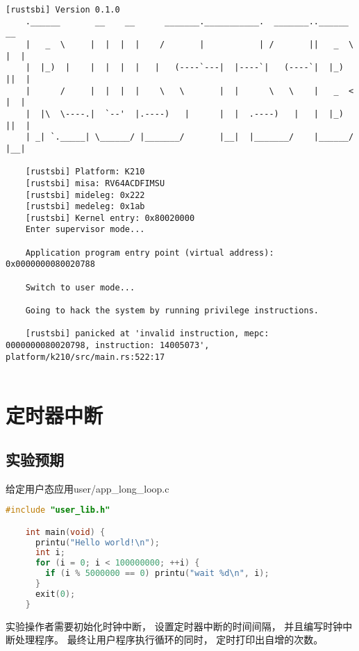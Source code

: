 \begin{lstlisting}[caption={lab2实验结果}, label={lst:app_illegal_instruction_result}]
    [rustsbi] Version 0.1.0
    .______       __    __      _______.___________.  _______..______   __
    |   _  \     |  |  |  |    /       |           | /       ||   _  \ |  |
    |  |_)  |    |  |  |  |   |   (----`---|  |----`|   (----`|  |_)  ||  |
    |      /     |  |  |  |    \   \       |  |      \   \    |   _  < |  |
    |  |\  \----.|  `--'  |.----)   |      |  |  .----)   |   |  |_)  ||  |
    | _| `._____| \______/ |_______/       |__|  |_______/    |______/ |__|
    
    [rustsbi] Platform: K210
    [rustsbi] misa: RV64ACDFIMSU
    [rustsbi] mideleg: 0x222
    [rustsbi] medeleg: 0x1ab
    [rustsbi] Kernel entry: 0x80020000
    Enter supervisor mode...
    
    Application program entry point (virtual address): 0x0000000080020788
    
    Switch to user mode...
    
    Going to hack the system by running privilege instructions.
    
    [rustsbi] panicked at 'invalid instruction, mepc: 0000000080020798, instruction: 14005073', platform/k210/src/main.rs:522:17
        
\end{lstlisting}

\section{定时器中断}

\subsection{实验预期}

给定用户态应用user/app\_long\_loop.c

\begin{lstlisting}[caption={用户态应用app\_long\_loop.c}, label={lst:app_long_loop}, language=C]
    #include "user_lib.h"

    int main(void) {
      printu("Hello world!\n");
      int i;
      for (i = 0; i < 100000000; ++i) {
        if (i % 5000000 == 0) printu("wait %d\n", i);
      }
      exit(0);
    }
\end{lstlisting}

实验操作者需要初始化时钟中断，
设置定时器中断的时间间隔，
并且编写时钟中断处理程序。
最终让用户程序执行循环的同时，
定时打印出自增的次数。

